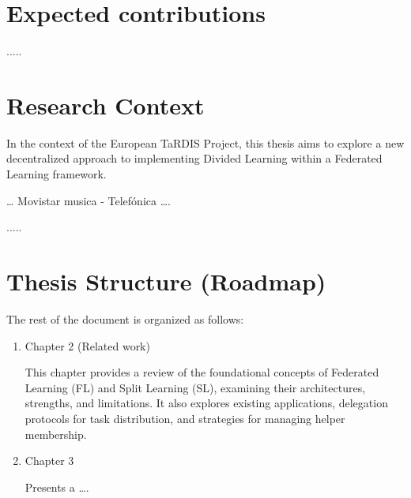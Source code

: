 \section{Expected contributions}
\label{sub:expectedContributions}


.....

\section{Research Context}
\label{sub:ResearchContext}

In the context of the European TaRDIS Project, this thesis aims to explore a new decentralized approach to implementing Divided Learning within a Federated Learning framework. 

… Movistar musica - Telefónica ….

.....

\section{Thesis Structure (Roadmap)}
\label{sub:roadMap}

The rest of the document is organized as follows:

\begin{enumerate}

 \item Chapter 2 (Related work)
 
 This chapter provides a review of the foundational concepts of Federated Learning (FL) and Split Learning (SL), examining their architectures, strengths, and limitations. It also explores existing applications, delegation protocols for task distribution, and strategies for managing helper membership.

 \item Chapter 3 
 
 Presents a ….
 

\end{enumerate}


